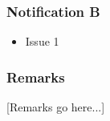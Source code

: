 \subsubsection*{Notification B}
\begin{itemize}
	\item Issue 1
\end{itemize}
\subsubsection*{Remarks}
[Remarks go here...]